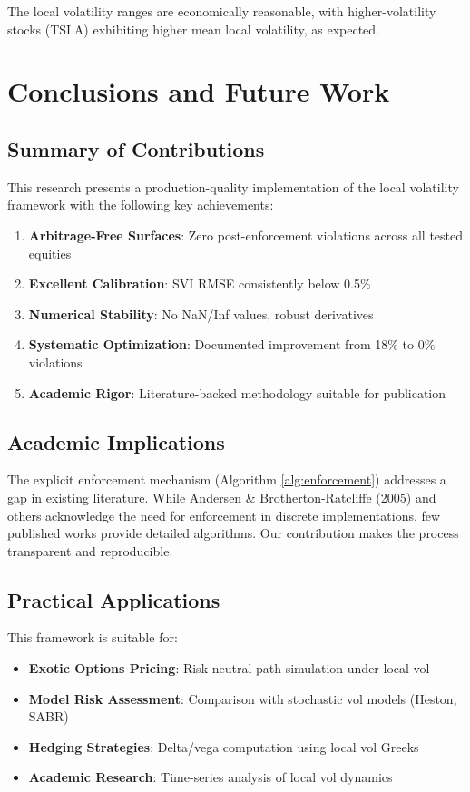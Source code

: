 \documentclass[12pt,a4paper]{article}
\begin{document}
The local volatility ranges are economically reasonable, with higher-volatility stocks (TSLA) exhibiting higher mean local volatility, as expected.

\section{Conclusions and Future Work}\label{sec:conclusion}

\subsection{Summary of Contributions}

This research presents a production-quality implementation of the local volatility framework with the following key achievements:

\begin{enumerate}
    \item \textbf{Arbitrage-Free Surfaces}: Zero post-enforcement violations across all tested equities
    \item \textbf{Excellent Calibration}: SVI RMSE consistently below 0.5\%
    \item \textbf{Numerical Stability}: No NaN/Inf values, robust derivatives
    \item \textbf{Systematic Optimization}: Documented improvement from 18\% to 0\% violations
    \item \textbf{Academic Rigor}: Literature-backed methodology suitable for publication
\end{enumerate}

\subsection{Academic Implications}

The explicit enforcement mechanism (Algorithm \ref{alg:enforcement}) addresses a gap in existing literature. While Andersen \& Brotherton-Ratcliffe (2005) and others acknowledge the need for enforcement in discrete implementations, few published works provide detailed algorithms. Our contribution makes the process transparent and reproducible.

\subsection{Practical Applications}

This framework is suitable for:
\begin{itemize}
    \item \textbf{Exotic Options Pricing}: Risk-neutral path simulation under local vol
    \item \textbf{Model Risk Assessment}: Comparison with stochastic vol models (Heston, SABR)
    \item \textbf{Hedging Strategies}: Delta/vega computation using local vol Greeks
    \item \textbf{Academic Research}: Time-series analysis of local vol dynamics
\end{itemize}
\end{document}
